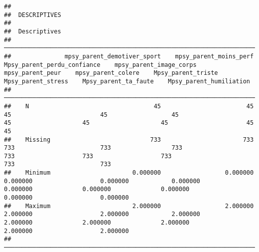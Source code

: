 \documentclass[
]{article}
\begin{document}
\begin{verbatim}
## 
##  DESCRIPTIVES
## 
##  Descriptives                                                                                                                                                                                                                                                            
##  ─────────────────────────────────────────────────────────────────────────────────────────────────────────────────────────────────────────────────────────────────────────────────────────────────────────────────────────────────────────────────────────────────────── 
##               mpsy_parent_demotiver_sport    mpsy_parent_moins_perf    Mpsy_parent_perdu_confiance    mpsy_parent_image_corps    mpsy_parent_peur    mpsy_parent_colere    Mpsy_parent_triste    Mpsy_parent_stress    Mpsy_parent_ta_faute    Mpsy_parent_humiliation   
##  ─────────────────────────────────────────────────────────────────────────────────────────────────────────────────────────────────────────────────────────────────────────────────────────────────────────────────────────────────────────────────────────────────────── 
##    N                                   45                        45                             45                         45                  45                    45                    45                    45                      45                         45   
##    Missing                            733                       733                            733                        733                 733                   733                   733                   733                     733                        733   
##    Minimum                       0.000000                  0.000000                       0.000000                   0.000000            0.000000              0.000000              0.000000              0.000000                0.000000                   0.000000   
##    Maximum                       2.000000                  2.000000                       2.000000                   2.000000            2.000000              2.000000              2.000000              2.000000                2.000000                   2.000000   
##  ───────────────────────────────────────────────────────────────────────────────────────────────────────────────────────────────────────────────────────────────────────────────────────────────────────────────────────────────────────────────────────────────────────
\end{verbatim}
\end{document}
